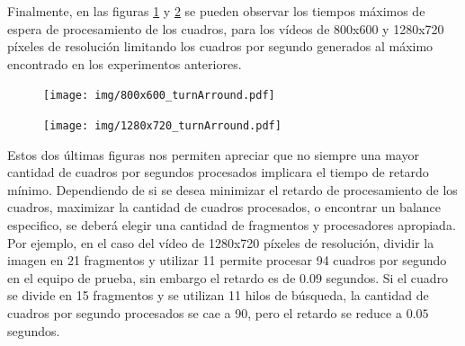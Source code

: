 Finalmente, en las figuras \ref{800turnArround} y \ref{1280turnArround} se
pueden observar los tiempos máximos de espera de procesamiento de los cuadros,
para los vídeos de 800x600 y 1280x720 píxeles de resolución limitando los
cuadros por segundo generados al máximo encontrado en los experimentos
anteriores.

\begin{figure}[!h]

	\texttt{[image: img/800x600\_turnArround.pdf]}
	\caption{}
	\label{800turnArround}

\end{figure}


\begin{figure}[!h]

	\texttt{[image: img/1280x720\_turnArround.pdf]}
	\caption{}
	\label{1280turnArround}

\end{figure}

Estos dos últimas figuras nos permiten apreciar que no siempre una mayor
cantidad de cuadros por segundos procesados implicara el tiempo de retardo
mínimo. Dependiendo de si se desea minimizar el retardo de procesamiento de los
cuadros, maximizar la cantidad de cuadros procesados, o encontrar un balance
especifico, se deberá elegir una cantidad de fragmentos y procesadores
apropiada. Por ejemplo, en el caso del vídeo de 1280x720 píxeles de resolución,
dividir la imagen en 21 fragmentos y utilizar 11 permite procesar 94 cuadros por
segundo en el equipo de prueba, sin embargo el retardo es de $0.09$ segundos. Si
el cuadro se divide en 15 fragmentos y se utilizan 11 hilos de búsqueda, la
cantidad de cuadros por segundo procesados se cae a 90, pero el retardo se
reduce a $0.05$ segundos.
